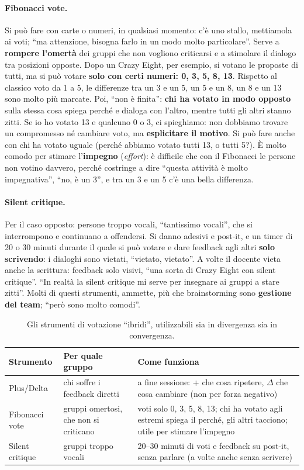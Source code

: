 \paragraph{Fibonacci vote.} Si può fare con carte o numeri, in qualsiasi momento: c'è uno
stallo, mettiamola ai voti; ``ma attenzione, bisogna farlo in un modo molto particolare''.
Serve a \textbf{rompere l'omertà} dei gruppi che non vogliono criticarsi e a stimolare il
dialogo tra posizioni opposte. Dopo un Crazy Eight, per esempio, si votano le proposte di
tutti, ma si può votare \textbf{solo con certi numeri: 0, 3, 5, 8, 13}. Rispetto al classico
voto da 1 a 5, le differenze tra un 3 e un 5, un 5 e un 8, un 8 e un 13 sono molto più
marcate. Poi, ``non è finita'': \textbf{chi ha votato in modo opposto} sulla stessa cosa
spiega perché e dialoga con l'altro, mentre tutti gli altri stanno zitti. Se io ho votato
13 e qualcuno 0 o 3, ci spieghiamo: non dobbiamo trovare un compromesso né cambiare voto,
ma \textbf{esplicitare il motivo}. Si può fare anche con chi ha votato uguale (perché
abbiamo votato tutti 13, o tutti 5?). È molto comodo per stimare l'\textbf{impegno}
(\emph{effort}): è difficile che con il Fibonacci le persone non votino davvero, perché
costringe a dire ``questa attività è molto impegnativa'', ``no, è un 3'', e tra un 3 e un 5
c'è una bella differenza.

\paragraph{Silent critique.} Per il caso opposto: persone troppo vocali, ``tantissimo
vocali'', che si interrompono e continuano a offendersi. Si danno adesivi e post-it, e un
timer di 20 o 30 minuti durante il quale si può votare e dare feedback agli altri
\textbf{solo scrivendo}: i dialoghi sono vietati, ``vietato, vietato''. A volte il docente
vieta anche la scrittura: feedback solo visivi, ``una sorta di Crazy Eight con silent
critique''. ``In realtà la silent critique mi serve per insegnare ai gruppi a stare
zitti''. Molti di questi strumenti, ammette, più che brainstorming sono
\textbf{gestione del team}; ``però sono molto comodi''.

\begin{table}[htbp]
\centering
\small
\begin{tabular}{@{}p{2.4cm}p{3.6cm}p{6.8cm}@{}}
\toprule
\textbf{Strumento} & \textbf{Per quale gruppo} & \textbf{Come funziona} \\
\midrule
Plus/Delta & chi soffre i feedback diretti & a fine sessione: + che cosa ripetere,
$\Delta$ che cosa cambiare (non per forza negativo) \\
Fibonacci vote & gruppi omertosi, che non si criticano & voti solo 0, 3, 5, 8, 13; chi ha
votato agli estremi spiega il perché, gli altri tacciono; utile per stimare l'impegno \\
Silent critique & gruppi troppo vocali & 20--30 minuti di voti e feedback su post-it,
senza parlare (a volte anche senza scrivere) \\
\bottomrule
\end{tabular}
\caption{Gli strumenti di votazione ``ibridi'', utilizzabili sia in divergenza sia in
convergenza.}
\label{a5:tab:voti}
\end{table}


